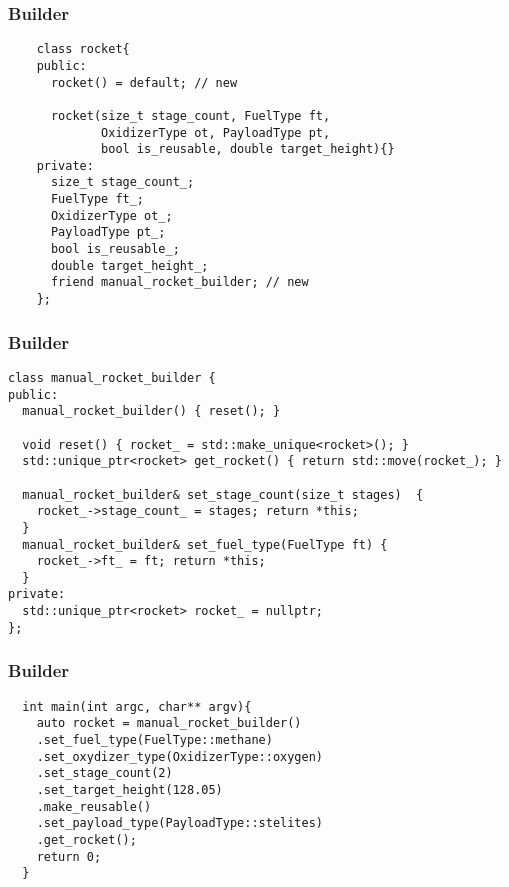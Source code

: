 \begin{frame}[fragile]
  \frametitle{Builder}
  \begin{verbatim}
    class rocket{
    public:
      rocket() = default; // new
      
      rocket(size_t stage_count, FuelType ft, 
             OxidizerType ot, PayloadType pt, 
             bool is_reusable, double target_height){}
    private:
      size_t stage_count_;
      FuelType ft_;
      OxidizerType ot_;
      PayloadType pt_;
      bool is_reusable_;
      double target_height_;
      friend manual_rocket_builder; // new
    };
  \end{verbatim}
\end{frame}

\begin{frame}[fragile]
  \frametitle{Builder}
  \begin{verbatim}
class manual_rocket_builder {
public:
  manual_rocket_builder() { reset(); }
  
  void reset() { rocket_ = std::make_unique<rocket>(); }
  std::unique_ptr<rocket> get_rocket() { return std::move(rocket_); }
  
  manual_rocket_builder& set_stage_count(size_t stages)  {
    rocket_->stage_count_ = stages; return *this;
  }
  manual_rocket_builder& set_fuel_type(FuelType ft) {
    rocket_->ft_ = ft; return *this;
  }
private:
  std::unique_ptr<rocket> rocket_ = nullptr;
};

  \end{verbatim}
\end{frame}

\begin{frame}[fragile]
  \frametitle{Builder}
  \begin{verbatim}
  int main(int argc, char** argv){
    auto rocket = manual_rocket_builder()
    .set_fuel_type(FuelType::methane)
    .set_oxydizer_type(OxidizerType::oxygen)
    .set_stage_count(2)
    .set_target_height(128.05)
    .make_reusable()
    .set_payload_type(PayloadType::stelites)
    .get_rocket();
    return 0;
  }
  \end{verbatim}
\end{frame}